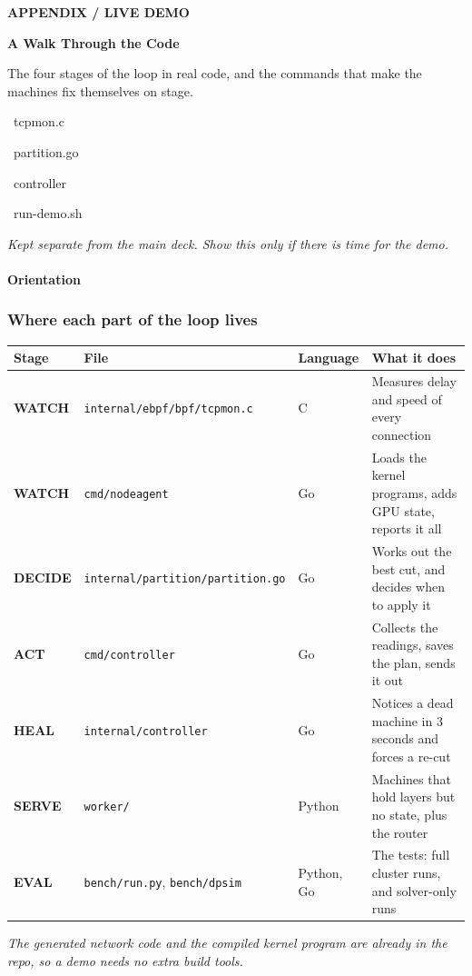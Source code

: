 \documentclass[aspectratio=169,11pt]{beamer}
\newcommand{\kefoot}[1]{\vfill{\scriptsize\itshape\color{kemuted}#1}}
\begin{document}
{
\begin{frame}[plain]
  \vspace{1.6em}
  {\scriptsize\bfseries\color{keamber}\ttfamily APPENDIX / LIVE DEMO}
  \par\vspace{0.9em}
  {\headfont\LARGE\bfseries\color{white}A Walk Through the Code}
  \par\vspace{0.9em}
  {\small\color{white!62!keink}The four stages of the loop in real code, and
   the commands that make the machines fix themselves on stage.}\par\vspace{1.4em}
  {\footnotesize\ttfamily\color{white!45!keink}
   \colorbox{keink2}{\strut\ tcpmon.c\ }\quad
   \colorbox{keink2}{\strut\ partition.go\ }\quad
   \colorbox{keink2}{\strut\ controller\ }\quad
   \colorbox{keink2}{\strut\ run-demo.sh\ }}\par\vspace{1.8em}
  {\scriptsize\itshape\color{kemuted}Kept separate from the main deck. Show
   this only if there is time for the demo.}
\end{frame}}

\begin{frame}[shrink=20]
  \framesubtitle{Orientation}
  \frametitle{Where each part of the loop lives}
  \footnotesize
  \begin{tabular}{@{}llll@{}}
    \toprule
    \bfseries Stage & \bfseries File & \bfseries Language &
      \bfseries What it does\\
    \midrule
    {\color{keamber}\bfseries WATCH} & \texttt{internal/ebpf/bpf/tcpmon.c} &
      C & Measures delay and speed of every connection\\
    {\color{keamber}\bfseries WATCH} & \texttt{cmd/nodeagent} & Go &
      Loads the kernel programs, adds GPU state, reports it all\\
    {\color{keteal}\bfseries DECIDE} & \texttt{internal/partition/partition.go} &
      Go & Works out the best cut, and decides when to apply it\\
    {\color{keamber}\bfseries ACT} & \texttt{cmd/controller} & Go &
      Collects the readings, saves the plan, sends it out\\
    {\color{keteal}\bfseries HEAL} & \texttt{internal/controller} & Go &
      Notices a dead machine in 3 seconds and forces a re-cut\\
    {\color{keteal}\bfseries SERVE} & \texttt{worker/} & Python &
      Machines that hold layers but no state, plus the router\\
    {\color{keamber}\bfseries EVAL} & \texttt{bench/run.py}, \texttt{bench/dpsim} &
      Python, Go & The tests: full cluster runs, and solver-only runs\\
    \bottomrule
  \end{tabular}
  \kefoot{The generated network code and the compiled kernel program are
          already in the repo, so a demo needs no extra build tools.}
\end{frame}
\end{document}
